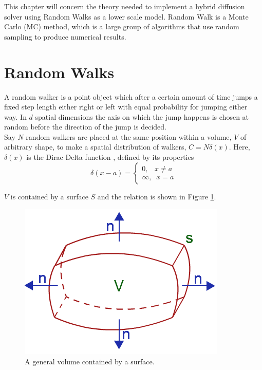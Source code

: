This chapter will concern the theory needed to implement a hybrid diffusion solver using Random Walks as a lower scale model. 
Random Walk is a Monte Carlo (MC) method, which is a large group of algorithms that use random sampling to produce numerical results. 



\section{Random Walks}
A random walker is a point object which after a certain amount of time jumps a fixed step length either right or left with equal probability for jumping either way. 
In $d$ spatial dimensions the axis on which the jump happens is chosen at random before the direction of the jump is decided. \\
Say $N$ random walkers are placed at the same position within a volume, $V$ of arbitrary shape, to make a spatial distribution of walkers, $C = N\delta(x)$. 
Here, $\delta(x)$ is the Dirac Delta function \cite{boas2006mathematical}, defined by its properties
\begin{equation}
 \delta(x-a) = \begin{cases}
              0 ,\;\;\; x\neq a\\
              \infty,\;\; x=a
             \end{cases}
\end{equation}

\noindent $V$ is contained by a surface $S$ and the relation is shown in Figure \ref{theory:divergence_theorem}. 

\begin{figure}[H]
\centering
\includegraphics[scale=0.6]{Figures/divergence_theorem.png}
 \caption{A general volume contained by a surface.}
 \label{theory:divergence_theorem}
\end{figure}

